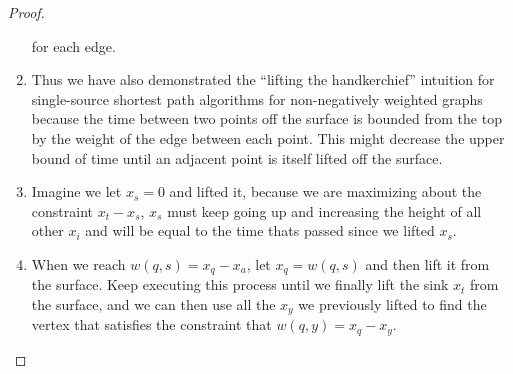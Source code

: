\documentclass{article}
\begin{document}
\begin{proof}
\begin{enumerate}
      for each edge. 
      \item Thus we have also demonstrated the ``lifting the handkerchief'' intuition for
      single-source shortest path algorithms for non-negatively weighted graphs because
      the time between two points off the surface is bounded from the top by the weight of
      the edge between each point. This might decrease the upper bound of time until an
      adjacent point is itself lifted off the surface. 
      \item Imagine we let \(x_s = 0\) and
      lifted it, because we are maximizing about the constraint \(x_t - x_s\), \(x_s\)
      must keep going up and increasing the height of all other \(x_i\) and will be equal
      to the time thats passed since we lifted \(x_s\).
      \item When we reach \(w(q,s) = x_q - x_a\), let \(x_q = w(q,s)\) and then lift it
      from the surface. Keep executing this process until we finally lift the sink \(x_t\)
      from the surface, and we can then use all the \(x_y\) we previously lifted to find
      the vertex that satisfies the constraint that \(w(q,y) = x_q - x_y \).
\end{enumerate}
\end{proof}
\end{document}
